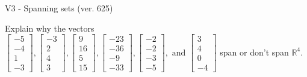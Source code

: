 \begin{exercise}
  \begin{exerciseTitle}V3 - Spanning sets (ver. 625)\end{exerciseTitle}
  \begin{exerciseStatement}
    Explain why the vectors \(\left[\begin{array}{r}
-5 \\
-4 \\
1 \\
-3
\end{array}\right] , \left[\begin{array}{r}
-3 \\
2 \\
4 \\
3
\end{array}\right] , \left[\begin{array}{r}
9 \\
16 \\
5 \\
15
\end{array}\right] , \left[\begin{array}{r}
-23 \\
-36 \\
-9 \\
-33
\end{array}\right] , \left[\begin{array}{r}
-2 \\
-2 \\
-3 \\
-5
\end{array}\right] , \text{ and } \left[\begin{array}{r}
3 \\
4 \\
0 \\
-4
\end{array}\right]\) span or don't span \(\mathbb{R}^4\). 
	



\end{exerciseStatement}
\end{exercise}
